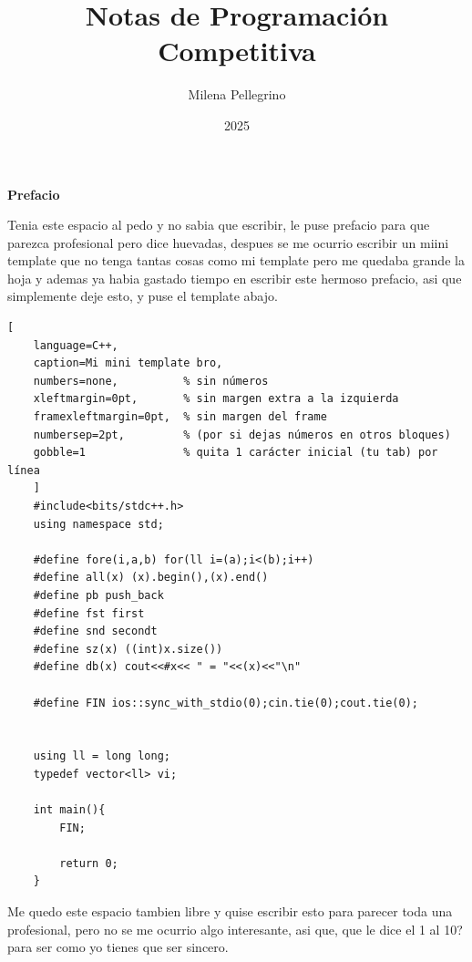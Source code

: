 \documentclass[a4paper,12pt]{book}
\begin{document}
	\author{Milena Pellegrino}
	\title{Notas de  Programación Competitiva}
	\date{2025}
	\frontmatter
	\maketitle
	
	\thispagestyle{empty} %
	\begin{center}
		{\Large \textbf{Prefacio}}
	\end{center}
	
	\vspace{1cm}
	
	Tenia este espacio al pedo y no sabia que escribir, le puse prefacio para que parezca profesional pero dice huevadas, despues se me ocurrio escribir un miini template que no tenga tantas cosas como mi template pero me quedaba grande la hoja y ademas ya habia gastado tiempo en escribir este hermoso prefacio, asi que simplemente deje esto, y puse el template abajo. 
	
	\vspace{1cm}
	
\begin{lstlisting}[
	language=C++,
	caption=Mi mini template bro,
	numbers=none,          % sin números
	xleftmargin=0pt,       % sin margen extra a la izquierda
	framexleftmargin=0pt,  % sin margen del frame
	numbersep=2pt,         % (por si dejas números en otros bloques)
	gobble=1               % quita 1 carácter inicial (tu tab) por línea
	]
	#include<bits/stdc++.h>
	using namespace std;
	
	#define fore(i,a,b) for(ll i=(a);i<(b);i++)
	#define all(x) (x).begin(),(x).end()
	#define pb push_back
	#define fst first
	#define snd secondt
	#define sz(x) ((int)x.size())
	#define db(x) cout<<#x<< " = "<<(x)<<"\n"
	
	#define FIN ios::sync_with_stdio(0);cin.tie(0);cout.tie(0); 
	
	
	using ll = long long;
	typedef vector<ll> vi;
	
	int main(){
		FIN; 

		return 0;
	}
\end{lstlisting}

	
	\vspace{1cm}
	
	Me quedo  este espacio tambien libre y quise escribir esto para parecer toda una profesional, pero no se me ocurrio algo interesante, asi que, que le dice el 1 al 10? para ser como yo tienes que ser sincero.
	
\end{document}
